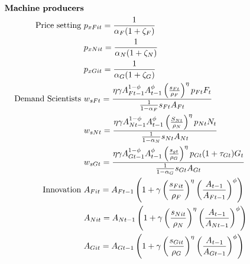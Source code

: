 \begin{align}
%
\text{\textbf{Machine producers}}\nonumber\\
\text{Price setting}\ \vspace{4mm}&p_{xFit}=\frac{1}{\alpha_F(1+\zeta_F)}\nonumber\\
&p_{xNit}=\frac{1}{\alpha_N(1+\zeta_N)}\nonumber\\
&p_{xGit}=\frac{1}{\alpha_G(1+\zeta_G)}
\nonumber\\ 
\text{Demand Scientists}\ \vspace{4mm}&
w_{sFt}=\frac{\eta \gamma A_{Ft-1}^{1-\phi}A_{t-1}^{\phi}\left(\frac{s_{Ft}}{\rho_F}\right)^{\eta}p_{Ft}F_t}{\frac{1}{1-\alpha_F}s_{Ft}A_{Ft}}\nonumber\\
&
w_{sNt}=\frac{\eta \gamma  A_{Nt-1}^{1-\phi}A_{t-1}^{\phi}\left(\frac{S_{Nt}}{\rho_N}\right)^{\eta}p_{Nt}N_t}{\frac{1}{1-\alpha_N}s_{Nt}A_{Nt}}\nonumber\\
&
w_{sGt}=\frac{\eta \gamma  A_{Gt-1}^{1-\phi}A_{t-1}^{\phi}\left(\frac{s_{gt}}{\rho_G}\right)^{\eta}p_{Gt}(1+\tau_{Gt})G_t}{\frac{1}{1-\alpha_G}s_{Gt}A_{Gt}}\nonumber\\
\text{Innovation}\ \vspace{4mm}&
A_{Fit}=A_{Ft-1}\left(1+\gamma\left(\frac{s_{Fit}}{\rho_F}\right)^{\eta}\left(\frac{A_{t-1}}{A_{Ft-1}}\right)^{\phi}\right)\nonumber \\
&
A_{Nit}=A_{Nt-1}\left(1+\gamma\left(\frac{s_{Nit}}{\rho_N}\right)^{\eta}\left(\frac{A_{t-1}}{A_{Nt-1}}\right)^{\phi}\right)\nonumber \\
&
A_{Git}=A_{Gt-1}\left(1+\gamma\left(\frac{s_{Git}}{\rho_G}\right)^{\eta}\left(\frac{A_{t-1}}{A_{Gt-1}}\right)^{\phi}\right)\nonumber \\

\end{align}
